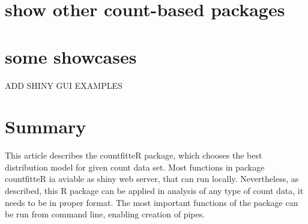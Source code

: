 
\section{show other count-based packages}


\section{some showcases}

ADD SHINY GUI EXAMPLES

\section{Summary}

This article describes the countfitteR package, which chooses the best distribution model for given count data set. Most functions in package countfitteR ia aviable as shiny web server, that can run locally. Nevertheless, as described, this R package can be applied in analysis of any type of count data, it needs to be in proper format. 
The most important functions of the package can be run from command line, enabling creation of pipes.



\address{Jaros\l{}aw Chilmoniuk\\
  University of Wroc\l{}aw\\
  Pl. Uniwersytecki 1, Wroc\l{}aw\\
  Poland\\
  ORCiD: 0000-0001-5467-018X\\
  }

\address{Madeleine Ruhe\\
  Brandenburg University of Technology Cottbus - Senftenberg\\
  Universit\"atsplatz 1, Senftenberg\\
  Germany\\
  ORCiD if desired\\
  }

